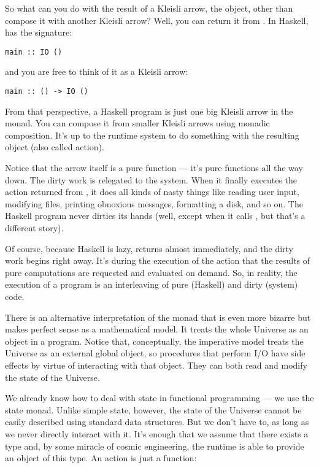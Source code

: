 So what can you do with the result of a Kleisli arrow, the 
object, other than compose it with another Kleisli arrow? Well, you can
return it from . In Haskell,  has the
signature:

\begin{verbatim}
main :: IO ()
\end{verbatim}

and you are free to think of it as a Kleisli arrow:

\begin{verbatim}
main :: () -> IO ()
\end{verbatim}

From that perspective, a Haskell program is just one big Kleisli arrow
in the  monad. You can compose it from smaller Kleisli arrows
using monadic composition. It's up to the runtime system to do something
with the resulting  object (also called  action).

Notice that the arrow itself is a pure function --- it's pure functions
all the way down. The dirty work is relegated to the system. When it
finally executes the  action returned from , it
does all kinds of nasty things like reading user input, modifying files,
printing obnoxious messages, formatting a disk, and so on. The Haskell
program never dirties its hands (well, except when it calls
, but that's a different story).

Of course, because Haskell is lazy,  returns almost
immediately, and the dirty work begins right away. It's during the
execution of the  action that the results of pure
computations are requested and evaluated on demand. So, in reality, the
execution of a program is an interleaving of pure (Haskell) and dirty
(system) code.

There is an alternative interpretation of the  monad that is
even more bizarre but makes perfect sense as a mathematical model. It
treats the whole Universe as an object in a program. Notice that,
conceptually, the imperative model treats the Universe as an external
global object, so procedures that perform I/O have side effects by
virtue of interacting with that object. They can both read and modify
the state of the Universe.

We already know how to deal with state in functional programming --- we
use the state monad. Unlike simple state, however, the state of the
Universe cannot be easily described using standard data structures. But
we don't have to, as long as we never directly interact with it. It's
enough that we assume that there exists a type  and,
by some miracle of cosmic engineering, the runtime is able to provide an
object of this type. An  action is just a function:

